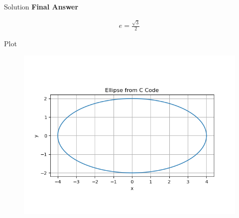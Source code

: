\documentclass{beamer}
\begin{document}
\begin{frame}{Solution}
\textbf{Final Answer}

\begin{align}
\boxed{e = \frac{\sqrt{3}}{2}}
\end{align}
\end{frame}


\begin{frame}{Plot}
    \begin{figure}
        \centering
        \includegraphics[width=0.7\linewidth]{./figs/Figure_1.png}
        \caption{}
        \label{fig:fig1}
    \end{figure}
\end{frame}
\end{document}
